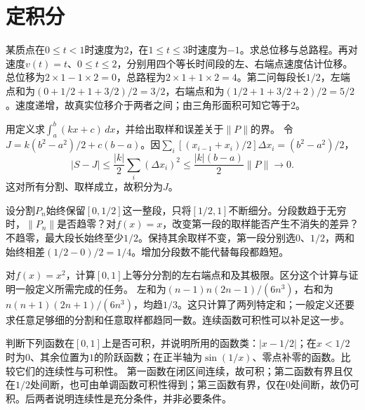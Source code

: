 \par\addvspace{12pt}

\section{定积分}

某质点在\(0\le t<1\)时速度为\(2\)，在\(1\le t\le3\)时速度为\(-1\)。求总位移与总路程。再对速度\(v(t)=t\)、\(0\le t\le2\)，分别用四个等长时间段的左、右端点速度估计位移。
\solutionanswer
总位移为\(2\times1-1\times2=0\)，总路程为\(2\times1+1\times2=4\)。第二问每段长\(1/2\)，左端点和为\((0+1/2+1+3/2)/2=3/2\)，右端点和为\((1/2+1+3/2+2)/2=5/2\)。速度递增，故真实位移介于两者之间；由三角形面积可知它等于\(2\)。


用定义求\(\int_a^b(kx+c)\,dx\)，并给出取样和误差关于\(\|P\|\)的界。
\solutionanswer
令\(J=k(b^2-a^2)/2+c(b-a)\)。因\(\sum_i[(x_{i-1}+x_i)/2]\Delta x_i=(b^2-a^2)/2\)，
\[
 |S-J|\le\frac{|k|}2\sum_i(\Delta x_i)^2\le\frac{|k|(b-a)}2\|P\|\to0.
\]
这对所有分割、取样成立，故积分为\(J\)。


设分割\(P_n\)始终保留\([0,1/2]\)这一整段，只将\([1/2,1]\)不断细分。分段数趋于无穷时，\(\|P_n\|\)是否趋零？对\(f(x)=x\)，改变第一段的取样能否产生不消失的差异？
\solutionanswer
不趋零，最大段长始终至少\(1/2\)。保持其余取样不变，第一段分别选\(0\)、\(1/2\)，两和始终相差\((1/2-0)/2=1/4\)。增加分段数不能代替每段都趋短。


对\(f(x)=x^2\)，计算\([0,1]\)上等分分割的左右端点和及其极限。区分这个计算与证明一般定义所需完成的任务。
\solutionanswer
左和为\((n-1)n(2n-1)/(6n^3)\)，右和为\(n(n+1)(2n+1)/(6n^3)\)，均趋\(1/3\)。这只计算了两列特定和；一般定义还要求任意足够细的分割和任意取样都趋同一数。连续函数可积性可以补足这一步。


判断下列函数在\([0,1]\)上是否可积，并说明所用的函数类：\(|x-1/2|\)；在\(x<1/2\)时为\(0\)、其余位置为\(1\)的阶跃函数；在正半轴为\(\sin(1/x)\)、零点补零的函数。比较它们的连续性与可积性。
\solutionanswer
第一函数在闭区间连续，故可积；第二函数有界且仅在\(1/2\)处间断，也可由单调函数可积性得到；第三函数有界，仅在\(0\)处间断，故仍可积。后两者说明连续性是充分条件，并非必要条件。


